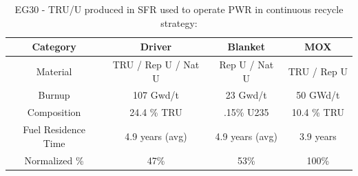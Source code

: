 \begin{table}[h]
    \centering
    \caption {EG30 - TRU/U produced in SFR used to operate PWR in continuous recycle strategy:}
        \begin{tabular}{|c|c|c|c|}
            \hline
            Category & Driver & Blanket & MOX \\ \hline
            Material & TRU / Rep U / Nat U & Rep U / Nat U & TRU / Rep U \\ \hline
            Burnup & 107 Gwd/t & 23 Gwd/t & 50 GWd/t \\ \hline
            Composition & 24.4 \% TRU & .15\% U235 & 10.4 \% TRU  \\ \hline
            Fuel Residence Time & 4.9 years (avg) & 4.9 years (avg) & 3.9 years \\ \hline
            Normalized \% & 47\% & 53\% & 100\% \\ \hline
            
        \end{tabular}
        \end {table}